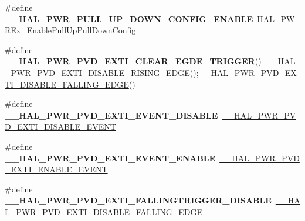\begin{DoxyCompactItemize}
\item 
\#define {\bfseries \+\_\+\+\_\+\+H\+A\+L\+\_\+\+P\+W\+R\+\_\+\+P\+U\+L\+L\+\_\+\+U\+P\+\_\+\+D\+O\+W\+N\+\_\+\+C\+O\+N\+F\+I\+G\+\_\+\+E\+N\+A\+B\+LE}~H\+A\+L\+\_\+\+P\+W\+R\+Ex\+\_\+\+Enable\+Pull\+Up\+Pull\+Down\+Config\hypertarget{group___h_a_l___p_w_r___aliased___macros_gadb15c53f7c44954ed13114d2a06310f8}{}\label{group___h_a_l___p_w_r___aliased___macros_gadb15c53f7c44954ed13114d2a06310f8}

\item 
\#define {\bfseries \+\_\+\+\_\+\+H\+A\+L\+\_\+\+P\+W\+R\+\_\+\+P\+V\+D\+\_\+\+E\+X\+T\+I\+\_\+\+C\+L\+E\+A\+R\+\_\+\+E\+G\+D\+E\+\_\+\+T\+R\+I\+G\+G\+ER}()~\hyperlink{group___p_w_r___exported___macro_ga1ca8fd7f3286a176f6be540c75a004c6}{\+\_\+\+\_\+\+H\+A\+L\+\_\+\+P\+W\+R\+\_\+\+P\+V\+D\+\_\+\+E\+X\+T\+I\+\_\+\+D\+I\+S\+A\+B\+L\+E\+\_\+\+R\+I\+S\+I\+N\+G\+\_\+\+E\+D\+GE}();\hyperlink{group___p_w_r___exported___macro_ga1ca57168205f8cd8d1014e6eb9465f2d}{\+\_\+\+\_\+\+H\+A\+L\+\_\+\+P\+W\+R\+\_\+\+P\+V\+D\+\_\+\+E\+X\+T\+I\+\_\+\+D\+I\+S\+A\+B\+L\+E\+\_\+\+F\+A\+L\+L\+I\+N\+G\+\_\+\+E\+D\+GE}()\hypertarget{group___h_a_l___p_w_r___aliased___macros_ga288b776e260c65b683ae05a335f5826b}{}\label{group___h_a_l___p_w_r___aliased___macros_ga288b776e260c65b683ae05a335f5826b}

\item 
\#define {\bfseries \+\_\+\+\_\+\+H\+A\+L\+\_\+\+P\+W\+R\+\_\+\+P\+V\+D\+\_\+\+E\+X\+T\+I\+\_\+\+E\+V\+E\+N\+T\+\_\+\+D\+I\+S\+A\+B\+LE}~\hyperlink{group___p_w_r___exported___macro_ga8bd379e960497722450c7cea474a7e7a}{\+\_\+\+\_\+\+H\+A\+L\+\_\+\+P\+W\+R\+\_\+\+P\+V\+D\+\_\+\+E\+X\+T\+I\+\_\+\+D\+I\+S\+A\+B\+L\+E\+\_\+\+E\+V\+E\+NT}\hypertarget{group___h_a_l___p_w_r___aliased___macros_ga42775d277d6bc8441d6e03a90a133f0b}{}\label{group___h_a_l___p_w_r___aliased___macros_ga42775d277d6bc8441d6e03a90a133f0b}

\item 
\#define {\bfseries \+\_\+\+\_\+\+H\+A\+L\+\_\+\+P\+W\+R\+\_\+\+P\+V\+D\+\_\+\+E\+X\+T\+I\+\_\+\+E\+V\+E\+N\+T\+\_\+\+E\+N\+A\+B\+LE}~\hyperlink{group___p_w_r___exported___macro_gae5ba5672fe8cb7c1686c7f2cc211b128}{\+\_\+\+\_\+\+H\+A\+L\+\_\+\+P\+W\+R\+\_\+\+P\+V\+D\+\_\+\+E\+X\+T\+I\+\_\+\+E\+N\+A\+B\+L\+E\+\_\+\+E\+V\+E\+NT}\hypertarget{group___h_a_l___p_w_r___aliased___macros_ga86b9e24e897c84a1441dc92c88435c00}{}\label{group___h_a_l___p_w_r___aliased___macros_ga86b9e24e897c84a1441dc92c88435c00}

\item 
\#define {\bfseries \+\_\+\+\_\+\+H\+A\+L\+\_\+\+P\+W\+R\+\_\+\+P\+V\+D\+\_\+\+E\+X\+T\+I\+\_\+\+F\+A\+L\+L\+I\+N\+G\+T\+R\+I\+G\+G\+E\+R\+\_\+\+D\+I\+S\+A\+B\+LE}~\hyperlink{group___p_w_r___exported___macro_ga1ca57168205f8cd8d1014e6eb9465f2d}{\+\_\+\+\_\+\+H\+A\+L\+\_\+\+P\+W\+R\+\_\+\+P\+V\+D\+\_\+\+E\+X\+T\+I\+\_\+\+D\+I\+S\+A\+B\+L\+E\+\_\+\+F\+A\+L\+L\+I\+N\+G\+\_\+\+E\+D\+GE}\hypertarget{group___h_a_l___p_w_r___aliased___macros_gaeccf45c0c61b98bd212bd7cf905c65fd}{}\label{group___h_a_l___p_w_r___aliased___macros_gaeccf45c0c61b98bd212bd7cf905c65fd}


\end{DoxyCompactItemize}

